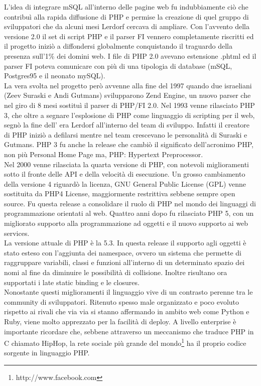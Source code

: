 L'idea di integrare mSQL all’interno delle pagine web fu indubbiamente ciò che contribuì alla rapida diffusione di PHP e permise la creazione di quel gruppo di sviluppatori che da alcuni mesi Lerdorf cercava di ampliare.
Con l’avvento della versione 2.0 il set di script PHP e il parser FI vennero completamente riscritti ed il progetto iniziò a diffondersi globalmente conquistando il traguardo della presenza sull’1\% dei domini web. I file di PHP 2.0 avevano estensione .phtml ed il parser FI poteva comunicare con più di una tipologia di database (mSQL, Postgres95 e il neonato mySQL).\\
La vera svolta nel progetto però avvenne alla fine del 1997 quando due israeliani (Zeev Suraski e Andi Gutmans) svilupparono Zend Engine, un nuovo parser che nel giro di 8 mesi sostituì il parser di PHP/FI 2.0. Nel 1993 venne rilasciato PHP 3, che oltre a segnare l’esplosione di PHP come linguaggio di scripting per il web, segnò la fine dell’ era Lerdorf all’interno del team di sviluppo. Infatti il creatore di PHP iniziò a defilarsi mentre nel team crescevano le personalità di Suraski e Gutmans. PHP 3 fu anche la release che cambiò il significato dell'acronimo PHP, non più Personal Home Page ma, PHP: Hypertext Preprocessor.\\
Nel 2000 venne rilasciata la quarta versione di PHP, con notevoli miglioramenti sotto il fronte delle API e della velocità di esecuzione. Un grosso cambiamento della versione 4 riguardò la licenza, GNU General Public License (GPL) venne sostituita da PHP4 License, maggiormente restrittiva sebbene sempre open source. Fu questa release a consolidare il ruolo di PHP nel mondo dei linguaggi di programmazione orientati al web. Quattro anni dopo fu rilasciato PHP 5, con un migliorato supporto alla programmazione ad oggetti e il nuovo supporto ai web services.\\
La versione attuale di PHP è la 5.3. In questa release il supporto agli oggetti è stato esteso con l'aggiunta dei namespace, ovvero un sistema che permette di raggruppare variabili, classi e funzioni all’interno di un determinato spazio dei nomi al fine da diminuire le possibilità di collisione. Inoltre risultano ora supportati i late static binding e le closures.\\
Nonostante questi miglioramenti il linguaggio vive di un contrasto perenne tra le community di sviluppatori. Ritenuto spesso male organizzato e poco evoluto rispetto ai rivali che via via si stanno affermando in ambito web come Python e Ruby, viene molto apprezzato per la facilità di deploy. A livello enterprise è importante ricordare che, sebbene attraverso un meccanismo che traduce PHP in C chiamato HipHop\cite{hiphop}, la rete sociale più grande del mondo\footnote{http://www.facebook.com} ha il proprio codice sorgente in linguaggio PHP.

